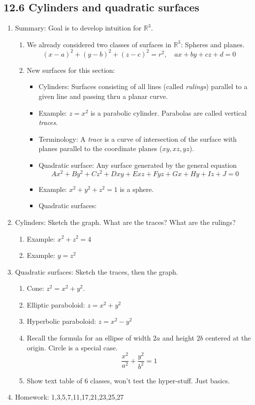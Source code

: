 \documentclass{article}
\begin{document}
\subsection{12.6 Cylinders and quadratic surfaces}
\begin{enumerate}

\item Summary: Goal is to develop intuition for $\mathbb{R}^3$.
\begin{enumerate}
\item We already considered two classes of surfaces in $\mathbb{R}^3$: Spheres and planes.
\[
(x-a)^2+(y-b)^2+(z-c)^2=r^2, \quad ax+by+cz+d=0
\]
\item New surfaces for this section:
\begin{itemize}
\item Cylinders: Surfaces consisting of all lines (called \emph{rulings}) parallel to a given line and passing thru a planar curve.
\item Example: $z=x^2$ is a parabolic cylinder. Parabolas are called vertical \emph{traces}.
\item Terminology: A \emph{trace} is a curve of intersection of the surface with planes parallel to the coordinate planes ($xy, xz, yz$).
\item Quadratic surface: Any surface generated by the general equation
\[
Ax^2+By^2+Cz^2+Dxy+Exz+Fyz+Gx+Hy+Iz+J=0
\]
\item Example: $x^2+y^2+z^2=1$ is a sphere.
\item Quadratic surfaces: 
\end{itemize}
\end{enumerate}

\item Cylinders: Sketch the graph. What are the traces? What are the rulings?
\begin{enumerate}
\item Example: $x^2+z^2=4$
\item Example: $y=z^2$
\end{enumerate}

\item Quadratic surfaces: Sketch the traces, then the graph.
\begin{enumerate}
\item Cone: $z^2=x^2+y^2$.
\item Elliptic paraboloid: $z=x^2+y^2$
\item Hyperbolic paraboloid: $z=x^2-y^2$
\item Recall the formula for an ellipse of width $2a$ and height $2b$ centered at the origin. Circle is a special case.
\[
\frac{x^2}{a^2}+\frac{y^2}{b^2}=1
\]
\item Show text table of 6 classes, won't test the hyper-stuff. Just basics.
\end{enumerate}

\item Homework: 1,3,5,7,11,17,21,23,25,27

\end{enumerate}
\end{document}
